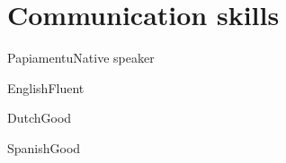 \documentclass{tccv}
\begin{document}









\section{Communication skills}

\begin{factlist}
    \item{Papiamentu}{Native speaker}
    \item{English}{Fluent}
    \item{Dutch}{Good}
    \item{Spanish}{Good}
\end{factlist}
\end{document}
